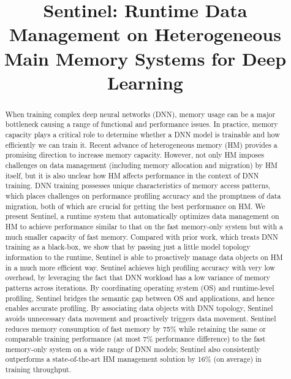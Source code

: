 \documentclass[sigconf,anonymous]{acmart}
\newcommand{\name}{Sentinel\xspace}
\begin{document}

\date{}

\title{\name: Runtime Data Management on Heterogeneous Main Memory Systems for Deep Learning}


\begin{abstract}

\textcolor{check}{
When training complex deep neural networks (DNN), memory usage can be a major bottleneck causing a range of functional and performance issues.  In practice, memory capacity plays a critical role to determine whether a DNN model is trainable and how efficiently we can train it. Recent advance of heterogeneous memory (HM) provides a promising direction to increase memory capacity. However, not only HM imposes challenges on data management (including memory allocation and migration) by HM itself, but it is also unclear how HM affects performance in the context of DNN training.   %
DNN training possesses unique characteristics of memory access patterns, which places challenges on performance profiling accuracy and the promptness of data migration, both of which are crucial for getting the best performance on HM.}  We present \name, a runtime system that automatically optimizes data management on HM to achieve performance similar to that on the fast memory-only system but with a much smaller capacity of fast memory.  \textcolor{check}{Compared with prior work, which treats DNN training as a black-box, we show that by passing just a little model topology information to the runtime, \name is able to proactively manage data objects on HM in a much more efficient way.}  \textcolor{check}{\name achieves high profiling accuracy with very low overhead, by leveraging the fact that DNN workload has a low variance of memory patterns across iterations.}  By coordinating operating system (OS) and runtime-level profiling, \name bridges the semantic gap between OS and applications, and hence enables accurate profiling. By associating data objects with DNN topology, \name avoids unnecessary data movement and proactively triggers data movement. \name reduces memory consumption of fast memory by 75\% while retaining the same or comparable training performance (at most 7\% performance difference) to the fast memory-only system on a wide range of DNN models; \textcolor{check}{\name also consistently outperforms a state-of-the-art HM management solution by 16\% (on average) in training throughput.}
\end{abstract}
\end{document}

